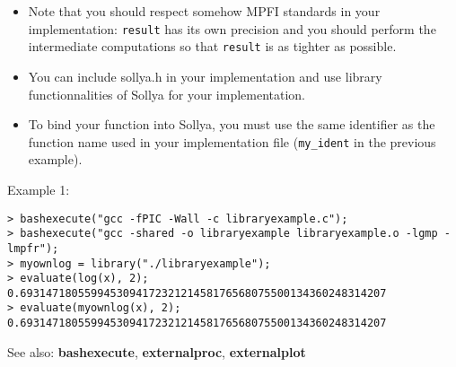 \begin{itemize}
\item Note that you should respect somehow MPFI standards in your implementation:
   \verb|result| has its own precision and you should perform the 
   intermediate computations so that \verb|result| is as tighter as possible.

\item You can include sollya.h in your implementation and use library 
   functionnalities of Sollya for your implementation.

\item To bind your function into Sollya, you must use the same identifier as the
   function name used in your implementation file (\verb|my_ident| in the previous
   example).
\end{itemize}
\noindent Example 1: 
\begin{center}\begin{minipage}{15cm}\begin{Verbatim}[frame=single]
> bashexecute("gcc -fPIC -Wall -c libraryexample.c");
> bashexecute("gcc -shared -o libraryexample libraryexample.o -lgmp -lmpfr");
> myownlog = library("./libraryexample");
> evaluate(log(x), 2);
0.693147180559945309417232121458176568075500134360248314207
> evaluate(myownlog(x), 2);
0.693147180559945309417232121458176568075500134360248314207
\end{Verbatim}
\end{minipage}\end{center}
See also: \textbf{bashexecute}, \textbf{externalproc}, \textbf{externalplot}

